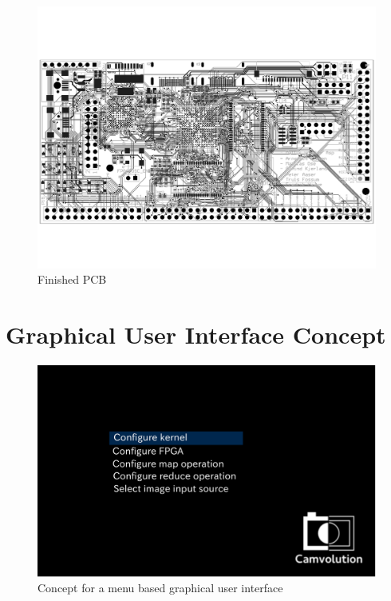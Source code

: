 \begin{figure}
    \includegraphics[width=\paperwidth, angle=90]{img/PCB_Finished.pdf}
    \caption{Finished PCB}
    \label{fig:PCB_Finished}
\end{figure}

\chapter{Graphical User Interface Concept}
\begin{figure}
\centering
    \includegraphics[width=15cm]{img/gui_concept.pdf}
    \caption{Concept for a menu based graphical user interface}
    \label{fig:gui_concept}
\end{figure}

%

